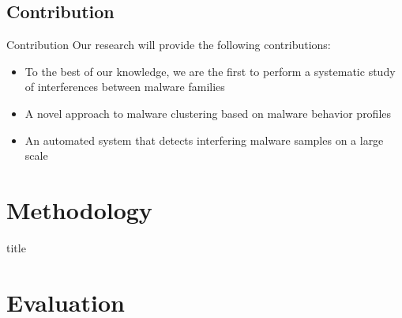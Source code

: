\documentclass[]{beamer}
\begin{document}
\subsection{Contribution}
\label{sub:Contribution}
\begin{frame}[t]{Contribution}
Our research will provide the following contributions:
\begin{itemize}
  \item To the best of our knowledge, we are the first to perform a systematic study of interferences between malware families\\
  \item A novel approach to malware clustering based on malware behavior profiles
  \item An automated system that detects interfering malware samples on a large scale
\end{itemize}
\end{frame}
\section{Methodology}
\label{sec:Methodology}
\begin{frame}[t]{title}
  
\end{frame}

\section{Evaluation}
\label{sec:Evaluation}
\end{document}
